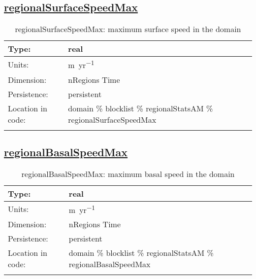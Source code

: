 \subsection[regionalSurfaceSpeedMax]{\hyperref[sec:var_tab_regionalStatsAM]{regionalSurfaceSpeedMax}}
\label{subsec:var_sec_regionalStatsAM_regionalSurfaceSpeedMax}
\begin{center}
\begin{longtable}{| p{2.0in} | p{4.0in} |}
        \hline 
        Type: & real \\
        \hline 
        Units: & \si{m.yr^{-1}} \\
        \hline 
        Dimension: & nRegions Time \\
        \hline 
        Persistence: & persistent \\
        \hline 
         Location in code: & domain \% blocklist \% regionalStatsAM \% regionalSurfaceSpeedMax \\
         \hline 
    \caption{regionalSurfaceSpeedMax: maximum surface speed in the domain}
\end{longtable}
\end{center}
\subsection[regionalBasalSpeedMax]{\hyperref[sec:var_tab_regionalStatsAM]{regionalBasalSpeedMax}}
\label{subsec:var_sec_regionalStatsAM_regionalBasalSpeedMax}
\begin{center}
\begin{longtable}{| p{2.0in} | p{4.0in} |}
        \hline 
        Type: & real \\
        \hline 
        Units: & \si{m.yr^{-1}} \\
        \hline 
        Dimension: & nRegions Time \\
        \hline 
        Persistence: & persistent \\
        \hline 
         Location in code: & domain \% blocklist \% regionalStatsAM \% regionalBasalSpeedMax \\
         \hline 
    \caption{regionalBasalSpeedMax: maximum basal speed in the domain}
\end{longtable}
\end{center}
